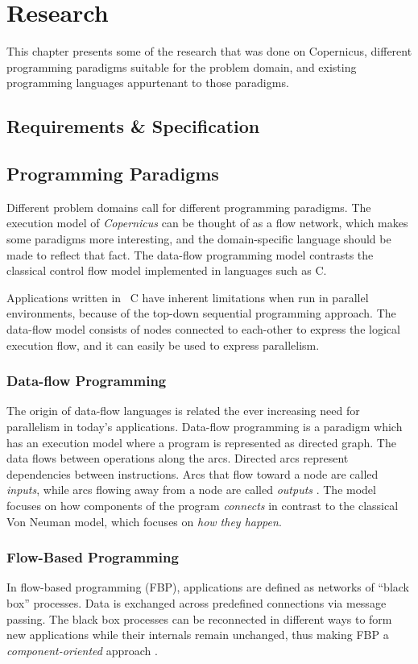 \chapter{Research}\label{chap:research}
This chapter presents some of the research that was done on
Copernicus, different programming paradigms suitable for the problem
domain, and existing programming languages appurtenant to those
paradigms.


\section{Requirements \& Specification}


\section{Programming Paradigms}
Different problem domains call for different programming
paradigms. The execution model of \emph{Copernicus} can be thought of
as a flow network, which makes some paradigms more interesting, and
the domain-specific language should be made to reflect that fact. The
data-flow programming model contrasts the classical control flow model
implemented in languages such as C.

Applications written in \eg~C have inherent limitations when run in
parallel environments, because of the top-down sequential programming
approach. The data-flow model consists of nodes connected to
each-other to express the logical execution flow, and it can easily be
used to express parallelism.


\subsection{Data-flow Programming}
The origin of data-flow languages is related the ever increasing need
for parallelism in today's applications. Data-flow programming is a
paradigm which has an execution model where a program is represented
as directed graph. The data flows between operations along the
arcs. Directed arcs represent dependencies between instructions. Arcs
that flow toward a node are called \emph{inputs}, while arcs flowing
away from a node are called \emph{outputs} \citep{johnston:2004}. The
model focuses on how components of the program \emph{connects} in
contrast to the classical Von Neuman model, which focuses on \emph{how
  they happen}.


\subsection{Flow-Based Programming}
In flow-based programming (FBP), applications are defined as networks
of ``black box'' processes. Data is exchanged across predefined
connections via message passing. The black box processes can be
reconnected in different ways to form new applications while their
internals remain unchanged, thus making FBP a
\emph{component-oriented} approach
\citep{morrison:2010,morrison:online}.


